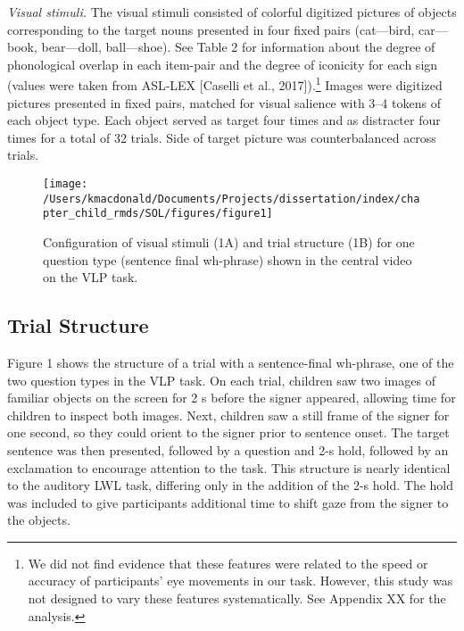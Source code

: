 \documentclass[oneside]{report}
\begin{document}
\emph{Visual stimuli.} The visual stimuli consisted of colorful
digitized pictures of objects corresponding to the target nouns
presented in four fixed pairs (cat---bird, car---book, bear---doll,
ball---shoe). See Table 2 for information about the degree of
phonological overlap in each item-pair and the degree of iconicity for
each sign (values were taken from ASL-LEX {[}Caselli et al.,
2017{]}).\footnote{We did not find evidence that these features were
  related to the speed or accuracy of participants' eye movements in our
  task. However, this study was not designed to vary these features
  systematically. See Appendix XX for the analysis.} Images were
digitized pictures presented in fixed pairs, matched for visual salience
with 3--4 tokens of each object type. Each object served as target four
times and as distracter four times for a total of 32 trials. Side of
target picture was counterbalanced across trials.
\begin{figure}[t]

{\centering \texttt{[image: /Users/kmacdonald/Documents/Projects/dissertation/index/chapter\_child\_rmds/SOL/figures/figure1]} 

}

\caption[Stimuli in the Visual Language Processing Task used in Experiment 1.1]{Configuration of visual stimuli (1A) and trial structure (1B) for one question type (sentence final wh-phrase) shown in the central video on the VLP task.}\label{fig:sol-trial-fig}
\end{figure}
\hypertarget{trial-structure}{%
\subsection{Trial Structure}\label{trial-structure}}

Figure 1 shows the structure of a trial with a sentence-final wh-phrase,
one of the two question types in the VLP task. On each trial, children
saw two images of familiar objects on the screen for 2 s before the
signer appeared, allowing time for children to inspect both images.
Next, children saw a still frame of the signer for one second, so they
could orient to the signer prior to sentence onset. The target sentence
was then presented, followed by a question and 2-s hold, followed by an
exclamation to encourage attention to the task. This structure is nearly
identical to the auditory LWL task, differing only in the addition of
the 2-s hold. The hold was included to give participants additional time
to shift gaze from the signer to the objects.
\end{document}
